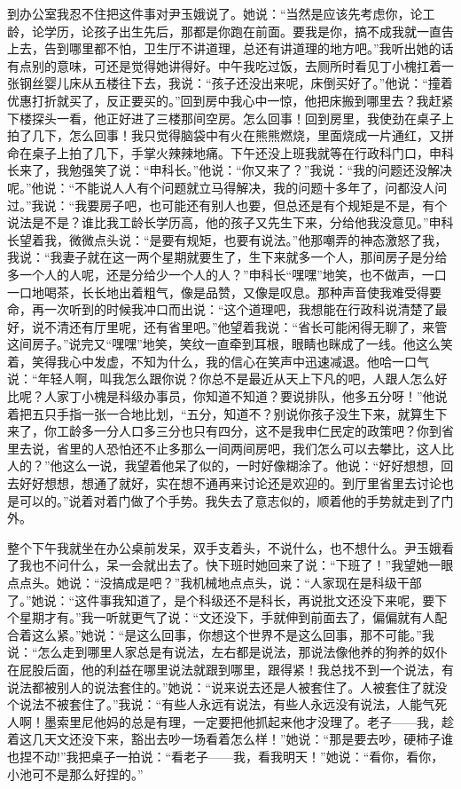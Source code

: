 \documentclass[12pt,oneside]{book}
\begin{document}
到办公室我忍不住把这件事对尹玉娥说了。她说：``当然是应该先考虑你，论工龄，论学历，论孩子出生先后，那都是你跑在前面。要我是你，搞不成我就一直告上去，告到哪里都不怕，卫生厅不讲道理，总还有讲道理的地方吧。''我听出她的话有点别的意味，可还是觉得她讲得好。中午我吃过饭，去厕所时看见丁小槐扛着一张钢丝婴儿床从五楼往下去，我说：``孩子还没出来呢，床倒买好了。''他说：``撞着优惠打折就买了，反正要买的。''回到房中我心中一惊，他把床搬到哪里去？我赶紧下楼探头一看，他正好进了三楼那间空房。怎么回事！回到房里，我使劲在桌子上拍了几下，怎么回事！我只觉得脑袋中有火在熊熊燃烧，里面烧成一片通红，又拼命在桌子上拍了几下，手掌火辣辣地痛。下午还没上班我就等在行政科门口，申科长来了，我勉强笑了说：``申科长。''他说：``你又来了？''我说：``我的问题还没解决呢。''他说：``不能说人人有个问题就立马得解决，我的问题十多年了，问都没人问过。''我说：``我要房子吧，也可能还有别人也要，但总还是有个规矩是不是，有个说法是不是？谁比我工龄长学历高，他的孩子又先生下来，分给他我没意见。''申科长望着我，微微点头说：``是要有规矩，也要有说法。''他那嘲弄的神态激怒了我，我说：``我妻子就在这一两个星期就要生了，生下来就多一个人，那间房子是分给多一个人的人呢，还是分给少一个人的人？''申科长``嘿嘿''地笑，也不做声，一口一口地喝茶，长长地出着粗气，像是品赞，又像是叹息。那种声音使我难受得要命，再一次听到的时候我冲口而出说：``这个道理吧，我想能在行政科说清楚了最好，说不清还有厅里呢，还有省里吧。''他望着我说：``省长可能闲得无聊了，来管这间房子。''说完又``嘿嘿''地笑，笑纹一直牵到耳根，眼睛也眯成了一线。他这么笑着，笑得我心中发虚，不知为什么，我的信心在笑声中迅速减退。他哈一口气说：``年轻人啊，叫我怎么跟你说？你总不是最近从天上下凡的吧，人跟人怎么好比呢？人家丁小槐是科级办事员，你知道不知道？要说排队，他多五分呀！''他说着把五只手指一张一合地比划，``五分，知道不？别说你孩子没生下来，就算生下来了，你工龄多一分人口多三分也只有四分，这不是我申仁民定的政策吧？你到省里去说，省里的人恐怕还不止多那么一间两间房吧，我们怎么可以去攀比，这人比人的？''他这么一说，我望着他呆了似的，一时好像糊涂了。他说：``好好想想，回去好好想想，想通了就好，实在想不通再来讨论还是欢迎的。到厅里省里去讨论也是可以的。''说着对着门做了个手势。我失去了意志似的，顺着他的手势就走到了门外。

整个下午我就坐在办公桌前发呆，双手支着头，不说什么，也不想什么。尹玉娥看了我也不问什么，呆一会就出去了。快下班时她回来了说：``下班了！''我望她一眼点点头。她说：``没搞成是吧？''我机械地点点头，说：``人家现在是科级干部了。''她说：``这件事我知道了，是个科级还不是科长，再说批文还没下来呢，要下个星期才有。''我一听就更气了说：``文还没下，手就伸到前面去了，偏偏就有人配合着这么紧。''她说：``是这么回事，你想这个世界不是这么回事，那不可能。''我说：``怎么走到哪里人家总是有说法，左右都是说法，那说法像他养的狗养的奴仆在屁股后面，他的利益在哪里说法就跟到哪里，跟得紧！我总找不到一个说法，有说法都被别人的说法套住的。''她说：``说来说去还是人被套住了。人被套住了就没个说法不被套住了。''我说：``有些人永远有说法，有些人永远没有说法，人能气死人啊！墨索里尼他妈的总是有理，一定要把他抓起来他才没理了。老子------我，趁着这几天文还没下来，豁出去吵一场看着怎么样！''她说：``那是要去吵，硬柿子谁也捏不动!''我把桌子一拍说：``看老子------我，看我明天！''她说：``看你，看你，小池可不是那么好捏的。''
\end{document}
